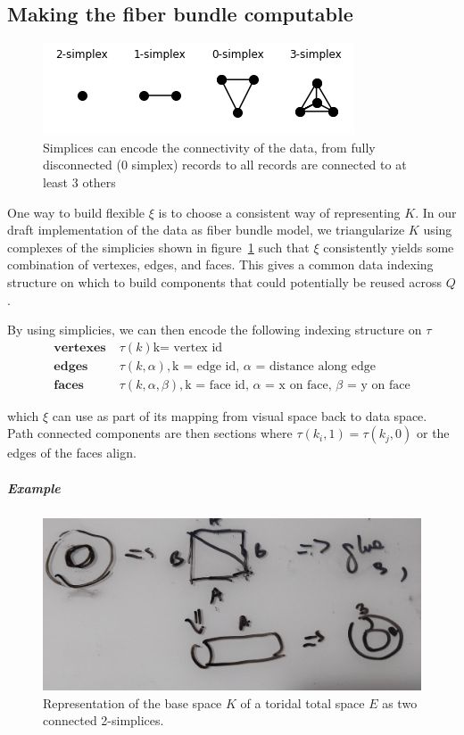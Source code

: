 \documentclass[../main.tex]{subfiles}
\begin{document}
\subsection{Making the fiber bundle computable}
\label{sec:triangulization}

\begin{figure}[ht!]
    \includegraphics{figures/math/simplex.png}
    \caption{Simplices can encode the connectivity of the data, from fully disconnected (0 simplex) records to all records are connected to at least 3 others}
    \label{fig:triangle_simplex}
\end{figure}

One way to build flexible $\xi$ is to choose a consistent way of representing $K$. In our draft implementation of the data as fiber bundle model, we triangularize $K$ using complexes of the simplicies shown in figure~\ref{fig:triangle_simplex} such that $\xi$ consistently yields some combination of vertexes, edges, and faces. This gives a common data indexing structure on which to build components that could potentially be reused across $Q$.

By using simplicies, we can then encode the following indexing structure on $\tau$
\begin{align*}
    \textbf{vertexes}\;& \tau(k) \text{k= vertex id}\\
    \textbf{edges}\;& \tau(k,\alpha), \text{k = edge id, $\alpha$ = distance along edge} \\
    \textbf{faces}\;& \tau(k,\alpha, \beta), \text{k = face id, $\alpha$ = x on face, $\beta$ = y on face}
\end{align*}

which $\xi$ can use as part of its mapping from visual space back to data space. Path connected components are then sections where $\tau(k_{i},1) = \tau(k_{j},0)$ or the edges of the faces align.  

\subparagraph{Example}
\begin{figure}[ht!]
    \label{fig:triangle_torus}
    \includegraphics[width=\textwidth]{figures/math/triangle_torus.png}
    \caption{Representation of the base space $K$ of a toridal total space $E$ as two connected 2-simplices.}
\end{figure}
\end{document}
